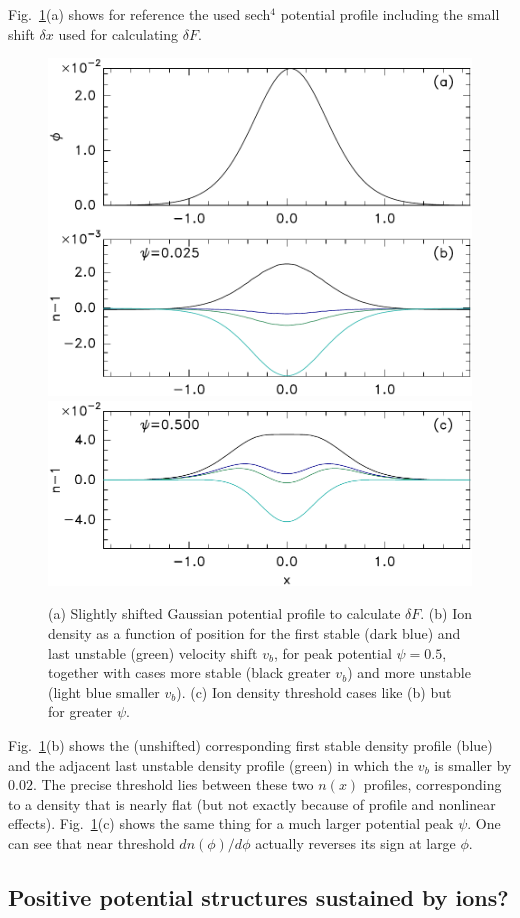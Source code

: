\documentclass[12pt]{article}
\begin{document}
Fig.\ \ref{phinofx}(a) shows for reference the used sech$^4$ potential
profile including the small shift $\delta x$ used for calculating
$\delta F$.
\begin{figure}[htp]
  \centering
  \includegraphics[width=0.5\hsize]{phinofx}
  \includegraphics[width=0.5\hsize]{phinofx3}
  \caption{(a) Slightly shifted Gaussian potential profile to
    calculate $\delta F$. (b) Ion density as a function of position
    for the first stable (dark blue) and last unstable (green)
    velocity shift $v_b$, for peak potential $\psi=0.5$, together with
    cases more stable (black greater $v_b$) and more unstable (light
    blue smaller $v_b$). (c) Ion density threshold cases like (b) but
    for greater $\psi$.}\label{phinofx}
\end{figure}
Fig.\ \ref{phinofx}(b) shows the (unshifted) corresponding first
stable density profile (blue) and the adjacent last unstable density
profile (green) in which the $v_b$ is smaller by $0.02$. The precise
threshold lies between these two $n(x)$ profiles, corresponding to a
density that is nearly flat (but not exactly because of profile and
nonlinear effects).  Fig.\ \ref{phinofx}(c) shows the same thing for a
much larger potential peak $\psi$. One can see that near threshold
$dn(\phi)/d\phi$ actually reverses its sign at large $\phi$.


\subsection{Positive potential structures sustained by ions?}
\end{document}
